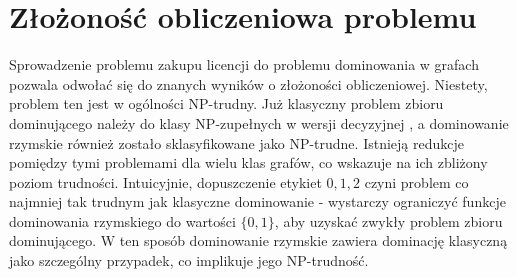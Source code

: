 \section{Złożoność obliczeniowa problemu}


Sprowadzenie problemu zakupu licencji do problemu dominowania w grafach pozwala odwołać się do znanych wyników o złożoności obliczeniowej. Niestety, problem ten jest w ogólności NP-trudny. Już klasyczny problem zbioru dominującego należy do klasy NP-zupełnych w wersji decyzyjnej \cite{booth1982dominating}, a dominowanie rzymskie również zostało sklasyfikowane jako NP-trudne. Istnieją redukcje pomiędzy tymi problemami dla wielu klas grafów, co wskazuje na ich zbliżony poziom trudności. Intuicyjnie, dopuszczenie etykiet $0,1,2$ czyni problem co najmniej tak trudnym jak klasyczne dominowanie - wystarczy ograniczyć funkcje dominowania rzymskiego do wartości $\{0,1\}$, aby uzyskać zwykły problem zbioru dominującego. W ten sposób dominowanie rzymskie zawiera dominację klasyczną jako szczególny przypadek, co implikuje jego NP-trudność.


